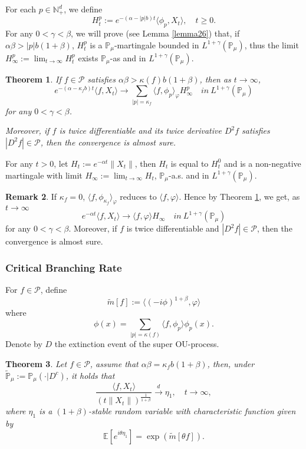 \documentclass[12pt]{amsart}
\theoremstyle{plain}
\newtheorem{thm}{Theorem}[section]
\theoremstyle{definition}
\newtheorem{rem}[thm]{Remark}
\numberwithin{equation}{section}
\begin{document}
For each $p\in \mathbb{N}_+^d$, we define
$$H_t^p:= e^{-(\alpha-|p|b)t}\langle\phi_p,X_t\rangle,\quad t\geq 0.$$
  For any $0<\gamma<\beta$, we will prove (see Lemma \ref{lemma26}) that, if $\alpha\beta>|p|b(1+\beta)$, $H_t^p$ is a $\mathbb{P}_{\mu}$-martingale bounded in $L^{1+\gamma}(\mathbb{P}_{\mu})$, thus the limit $H^p_{\infty}:=\lim_{t\rightarrow \infty}H_t^p$ exists $\mathbb{P}_{\mu}$-as and in $L^{1+\gamma}(\mathbb{P}_{\mu})$.
 \begin{thm}\label{Theorem11}
     If $f \in \mathcal{P}$ satisfies $\alpha\beta>\kappa(f)b(1+\beta)$, then as $t\rightarrow \infty$,
     $$e^{-(\alpha-\kappa_fb)t}\langle f, X_t\rangle \rightarrow\sum_{|p|=\kappa_f}\langle f, \phi_p\rangle_{\varphi} H_{\infty}^p \quad in~ L^{1+\gamma}(\mathbb{P}_{\mu})$$
     for any $0<\gamma<\beta$.

     Moreover, if $f$ is twice differentiable and its twice derivative $D^2 f$ satisfies $|D^2 f| \in \mathcal{P}$, then the convergence is almost sure.
 \end{thm}
For any $t>0$, let $H_t:=e^{-\alpha t}\|X_t\|$, then $H_t$ is equal to $H_t^0$ and is a non-negative martingale with limit $H_{\infty}:=\lim_{t\rightarrow\infty}H_t$,  $\mathbb{P}_{\mu}$-a.s. and in $L^{1+\gamma}(\mathbb{P}_{\mu})$.
 \begin{rem}
    If $\kappa_f=0$, $\langle f, \phi_{\kappa_f}\rangle_{\varphi}$ reduces to $\langle f,\varphi\rangle$. Hence by Theorem \ref{Theorem11}, we get, as $t\rightarrow \infty$
     $$e^{-\alpha t}\langle f, X_t\rangle \rightarrow \langle f, \varphi\rangle H_{\infty} \quad in~ L^{1+\gamma}(\mathbb{P}_{\mu})$$
    for any $0<\gamma<\beta$. Moreover, if $f$ is twice differentiable and $|D^2 f| \in \mathcal{P}$, then the convergence is almost sure.
 \end{rem}

\subsubsection{Critical Branching Rate}
For $f\in \mathcal{P}$, define
$$\tilde{m}[f]:= \langle(-i\phi)^{1+\beta},\varphi\rangle$$
where
$$\phi(x)=\sum_{|p|=\kappa(f)}\langle f,\phi_p\rangle\phi_p(x).$$
Denote by $D$ the extinction event of the super OU-process.
\begin{thm}\label{Theorem12}
Let $f\in\mathcal{P}$, assume that  $\alpha\beta=\kappa_fb(1+\beta)$, then, under $\tilde{\mathbb P}_\mu := \mathbb{P}_{\mu}(\cdot|D^c)$, it holds that
$$\frac{\langle f,X_t\rangle}{\left(t\|X_t\|\right)^{\frac{1}{1+\beta}}}\xrightarrow{d} \eta_1, \quad t\rightarrow \infty,$$
where $\eta_1$ is a $(1+\beta)$-stable random variable with characteristic function given by
$$\mathbb{E} [e^{i\theta \eta_1}]=\exp(\tilde{m}[\theta f]).$$
\end{thm}
\end{document}

